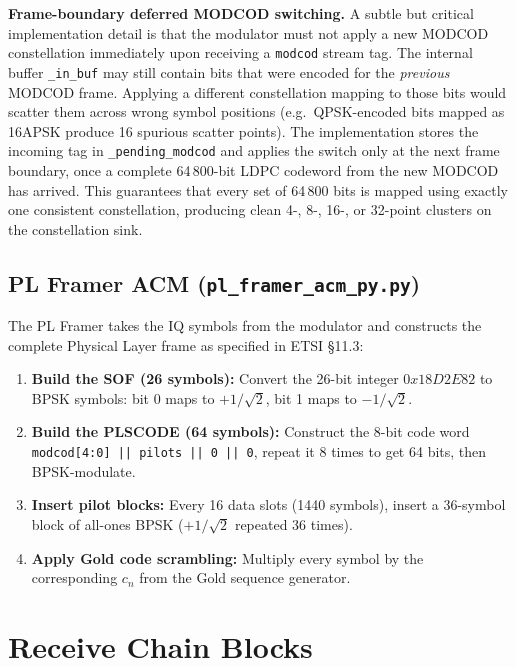\documentclass[12pt,a4paper]{report}
\begin{document}
\textbf{Frame-boundary deferred MODCOD switching.}
A subtle but critical implementation detail is that the modulator must not apply
a new MODCOD constellation immediately upon receiving a \texttt{modcod} stream
tag. The internal buffer \texttt{\_in\_buf} may still contain bits that were
encoded for the \emph{previous} MODCOD frame. Applying a different constellation
mapping to those bits would scatter them across wrong symbol positions (e.g.\
QPSK-encoded bits mapped as 16APSK produce 16 spurious scatter points). The
implementation stores the incoming tag in \texttt{\_pending\_modcod} and applies
the switch only at the next frame boundary, once a complete 64\,800-bit LDPC
codeword from the new MODCOD has arrived. This guarantees that every set of
64\,800 bits is mapped using exactly one consistent constellation, producing
clean 4-, 8-, 16-, or 32-point clusters on the constellation sink.

\subsection{PL Framer ACM (\texttt{pl\_framer\_acm\_py.py})}

The PL Framer takes the IQ symbols from the modulator and constructs the
complete Physical Layer frame as specified in ETSI \S11.3:

\begin{enumerate}
    \item \textbf{Build the SOF (26 symbols):} Convert the 26-bit integer
          $0x18D2E82$ to BPSK symbols: bit 0 maps to $+1/\sqrt{2}$,
          bit 1 maps to $-1/\sqrt{2}$.
    \item \textbf{Build the PLSCODE (64 symbols):} Construct the 8-bit code
          word \texttt{modcod[4:0] || pilots || 0 || 0}, repeat it 8 times to
          get 64 bits, then BPSK-modulate.
    \item \textbf{Insert pilot blocks:} Every 16 data slots (1440 symbols),
          insert a 36-symbol block of all-ones BPSK ($+1/\sqrt{2}$ repeated
          36 times).
    \item \textbf{Apply Gold code scrambling:} Multiply every symbol by the
          corresponding $c_n$ from the Gold sequence generator.
\end{enumerate}

\section{Receive Chain Blocks}
\end{document}
